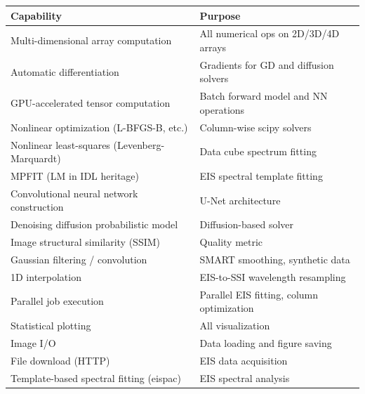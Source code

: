 \documentclass[11pt,a4paper]{article}
\begin{document}
\begin{table}[H]
\centering
\begin{tabular}{ll}
\toprule
\textbf{Capability} & \textbf{Purpose} \\
\midrule
Multi-dimensional array computation & All numerical ops on 2D/3D/4D arrays \\
Automatic differentiation & Gradients for GD and diffusion solvers \\
GPU-accelerated tensor computation & Batch forward model and NN operations \\
Nonlinear optimization (L-BFGS-B, etc.) & Column-wise scipy solvers \\
Nonlinear least-squares (Levenberg-Marquardt) & Data cube spectrum fitting \\
MPFIT (LM in IDL heritage) & EIS spectral template fitting \\
Convolutional neural network construction & U-Net architecture \\
Denoising diffusion probabilistic model & Diffusion-based solver \\
Image structural similarity (SSIM) & Quality metric \\
Gaussian filtering / convolution & SMART smoothing, synthetic data \\
1D interpolation & EIS-to-SSI wavelength resampling \\
Parallel job execution & Parallel EIS fitting, column optimization \\
Statistical plotting & All visualization \\
Image I/O & Data loading and figure saving \\
File download (HTTP) & EIS data acquisition \\
Template-based spectral fitting (eispac) & EIS spectral analysis \\
\bottomrule
\end{tabular}
\end{table}
\end{document}
